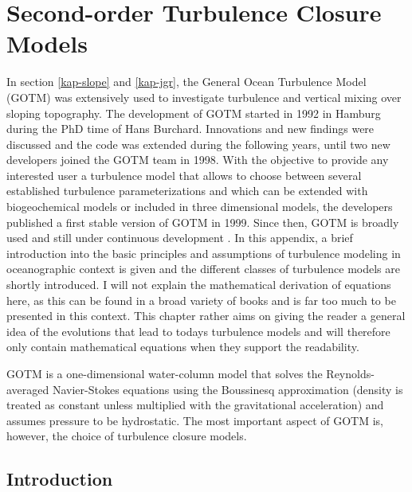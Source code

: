 \chapter{Second-order Turbulence Closure Models}

In section \ref{kap-slope} and \ref{kap-jgr}, the General Ocean Turbulence Model (GOTM) was extensively used to investigate turbulence and vertical mixing over sloping topography. The development of GOTM started in 1992 in Hamburg during the PhD time of Hans Burchard. Innovations and new findings were discussed and the code was extended during the following years, until two new developers joined the GOTM team in 1998. With the objective to provide any interested user a turbulence model that allows to choose between several established turbulence parameterizations and which can be extended with biogeochemical models or included in three dimensional models, the developers published a first stable version of GOTM in 1999. Since then, GOTM is broadly used and still under continuous development \citep[][]{gotm1999}. In this appendix, a brief introduction into the basic principles and assumptions of turbulence modeling in oceanographic context is given and the different classes of turbulence models are shortly introduced. I will not explain the mathematical derivation of equations here, as this can be found in a broad variety of books and is far too much to be presented in this context. This chapter rather aims on giving the reader a general idea of the evolutions that lead to todays turbulence models and will therefore only contain mathematical equations when they support the readability.

GOTM is a one-dimensional water-column model that solves the Reynolds-averaged Navier-Stokes equations using the Boussinesq approximation (density is treated as constant unless multiplied with the gravitational acceleration) and assumes pressure to be hydrostatic. The most important aspect of GOTM is, however, the choice of turbulence closure models. 

\section{Introduction}

